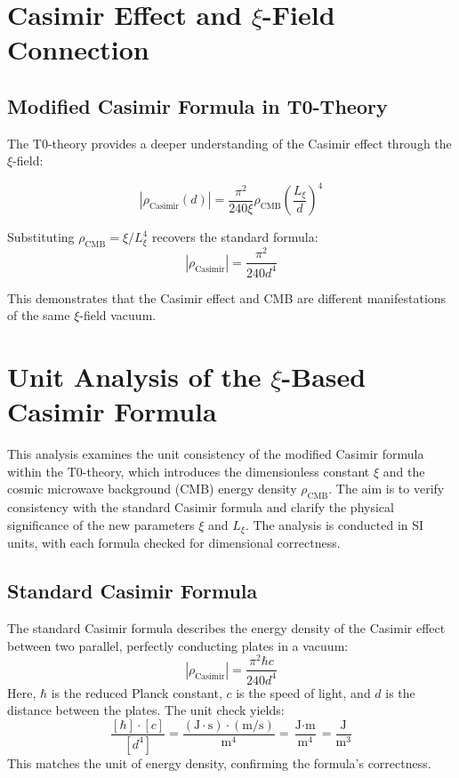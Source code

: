 \documentclass[12pt,a4paper]{article}
\theoremstyle{definition}
\theoremstyle{remark}
\begin{document}
	\section{Casimir Effect and $\xi$-Field Connection}
	
	\subsection{Modified Casimir Formula in T0-Theory}
	
	The T0-theory provides a deeper understanding of the Casimir effect through the $\xi$-field:
	
	\begin{equation}
		|\rho_{\text{Casimir}}(d)| = \frac{\pi^2}{240 \xi} \rho_{\text{CMB}} \left(\frac{L_\xi}{d}\right)^4
	\end{equation}
	
	Substituting $\rho_{\text{CMB}} = \xi/L_\xi^4$ recovers the standard formula:
	\begin{equation}
		|\rho_{\text{Casimir}}| = \frac{\pi^2}{240 d^4}
	\end{equation}
	
	This demonstrates that the Casimir effect and CMB are different manifestations of the same $\xi$-field vacuum.
	
	\section{Unit Analysis of the $\xi$-Based Casimir Formula}
	
	This analysis examines the unit consistency of the modified Casimir formula within the T0-theory, which introduces the dimensionless constant $\xi$ and the cosmic microwave background (CMB) energy density $\rho_{\text{CMB}}$. The aim is to verify consistency with the standard Casimir formula and clarify the physical significance of the new parameters $\xi$ and $L_\xi$. The analysis is conducted in SI units, with each formula checked for dimensional correctness.
	
	\subsection{Standard Casimir Formula}
	The standard Casimir formula describes the energy density of the Casimir effect between two parallel, perfectly conducting plates in a vacuum:
	\begin{equation}
		|\rho_{\text{Casimir}}| = \frac{\pi^2 \hbar c}{240 d^4}
	\end{equation}
	Here, $\hbar$ is the reduced Planck constant, $c$ is the speed of light, and $d$ is the distance between the plates. The unit check yields:
	\begin{equation}
		\frac{[\hbar] \cdot [c]}{[d^4]} = \frac{(\text{J} \cdot \text{s}) \cdot (\text{m}/\text{s})}{\text{m}^4} = \frac{\text{J} \cdot \text{m}}{\text{m}^4} = \frac{\text{J}}{\text{m}^3}
	\end{equation}
	This matches the unit of energy density, confirming the formula's correctness.
	
\end{document}
